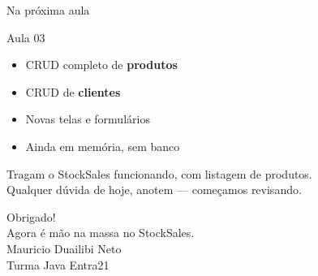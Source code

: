 \documentclass[aspectratio=169,11pt]{beamer}
\begin{document}
\begin{frame}{Na próxima aula}
  \begin{block}{Aula 03}
    \begin{itemize}
      \item CRUD completo de \textbf{produtos}
      \item CRUD de \textbf{clientes}
      \item Novas telas e formulários
      \item Ainda em memória, sem banco
    \end{itemize}
  \end{block}

  \vspace{0.8em}
  Tragam o StockSales funcionando, com listagem de produtos.\\
  Qualquer dúvida de hoje, anotem --- começamos revisando.
\end{frame}

\begin{frame}
  \begin{center}
    \Huge Obrigado!\\[0.8em]
    \Large Agora é mão na massa no StockSales.\\[1.2em]
    \normalsize Mauricio Duailibi Neto\\
    Turma Java Entra21
  \end{center}
\end{frame}
\end{document}
